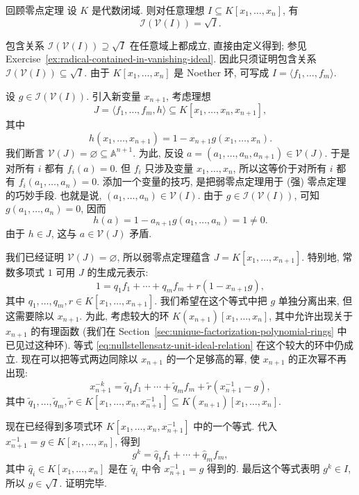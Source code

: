 \begin{Theorem}{回顾零点定理}\leavevmode\label{thm:nullstellensatz-recalled}
设 $K$ 是代数闭域. 则对任意理想 $I\subseteq K[x_{1},\ldots,x_{n}]$, 有
\[
  \mathcal{I}(\mathcal{V}(I))=\sqrt{I}.
\]
\end{Theorem}
\begin{Proof}
包含关系 $\mathcal{I}(\mathcal{V}(I))\supseteq\sqrt{I}$ 在任意域上都成立, 直接由定义得到; 参见 Exercise~\ref{ex:radical-contained-in-vanishing-ideal}. 因此只须证明包含关系 $\mathcal{I}(\mathcal{V}(I))\subseteq\sqrt{I}$. 由于 $K[x_{1},\ldots,x_{n}]$ 是 Noether 环, 可写成 $I=\langle f_{1},\ldots,f_{m}\rangle$.

设 $g\in\mathcal{I}(\mathcal{V}(I))$. 引入新变量 $x_{n+1}$, 考虑理想
\[
  J=\langle f_{1},\ldots,f_{m},h\rangle\subseteq K[x_{1},\ldots,x_{n},x_{n+1}],
\]
其中
\[
  h(x_{1},\ldots,x_{n+1})=1-x_{n+1}g(x_{1},\ldots,x_{n}).
\]
\BookPairedNote
  {我们断言 $\mathcal{V}(J)=\varnothing\subseteq\mathbb{A}^{n+1}$. 为此, 反设 $a=(a_{1},\ldots,a_{n},a_{n+1})\in\mathcal{V}(J)$. 于是对所有 $i$ 都有 $f_{i}(a)=0$. 但 $f_{i}$ 只涉及变量 $x_{1},\ldots,x_{n}$, 所以这等价于对所有 $i$ 都有 $f_{i}(a_{1},\ldots,a_{n})=0$.}
  {添加一个变量的技巧, 是把弱零点定理用于 (强) 零点定理的巧妙手段.}
也就是说, $(a_{1},\ldots,a_{n})\in\mathcal{V}(I)$. 由于 $g\in\mathcal{I}(\mathcal{V}(I))$, 可知 $g(a_{1},\ldots,a_{n})=0$, 因而
\[
  h(a)=1-a_{n+1}g(a_{1},\ldots,a_{n})=1\neq0.
\]
由于 $h\in J$, 这与 $a\in\mathcal{V}(J)$ 矛盾.

我们已经证明 $\mathcal{V}(J)=\varnothing$, 所以弱零点定理蕴含 $J=K[x_{1},\ldots,x_{n+1}]$. 特别地, 常数多项式 $1$ 可用 $J$ 的生成元表示:
\begin{equation}\label{eq:nullstellensatz-unit-ideal-relation}
  1=q_{1}f_{1}+\cdots+q_{m}f_{m}+r(1-x_{n+1}g),
\end{equation}
其中 $q_{1},\ldots,q_{m},r\in K[x_{1},\ldots,x_{n+1}]$. 我们希望在这个等式中把 $g$ 单独分离出来, 但这需要除以 $x_{n+1}$. 为此, 考虑较大的环 $K(x_{n+1})[x_{1},\ldots,x_{n}]$, 其中允许出现关于 $x_{n+1}$ 的有理函数 (我们在 Section~\ref{sec:unique-factorization-polynomial-rings} 中已见过这种环). 等式 \eqref{eq:nullstellensatz-unit-ideal-relation} 在这个较大的环中仍成立. 现在可以把等式两边同除以 $x_{n+1}$ 的一个足够高的幂, 使 $x_{n+1}$ 的正次幂不再出现:
\begin{equation}\label{eq:nullstellensatz-negative-variable-powers}
  x_{n+1}^{-k}=\widetilde{q}_{1}f_{1}+\cdots+\widetilde{q}_{m}f_{m}
    +\widetilde{r}(x_{n+1}^{-1}-g),
\end{equation}
其中 $\widetilde{q}_{1},\ldots,\widetilde{q}_{m},\widetilde{r}\in K[x_{1},\ldots,x_{n},x_{n+1}^{-1}]\subseteq K(x_{n+1})[x_{1},\ldots,x_{n}]$.

现在已经得到多项式环 $K[x_{1},\ldots,x_{n},x_{n+1}^{-1}]$ 中的一个等式. 代入 $x_{n+1}^{-1}=g\in K[x_{1},\ldots,x_{n}]$, 得到
\[
  g^{k}=\widehat{q}_{1}f_{1}+\cdots+\widehat{q}_{m}f_{m},
\]
其中 $\widehat{q}_{i}\in K[x_{1},\ldots,x_{n}]$ 是在 $\widetilde{q}_{i}$ 中令 $x_{n+1}^{-1}=g$ 得到的. 最后这个等式表明 $g^{k}\in I$, 所以 $g\in\sqrt{I}$. 证明完毕.
\end{Proof}

